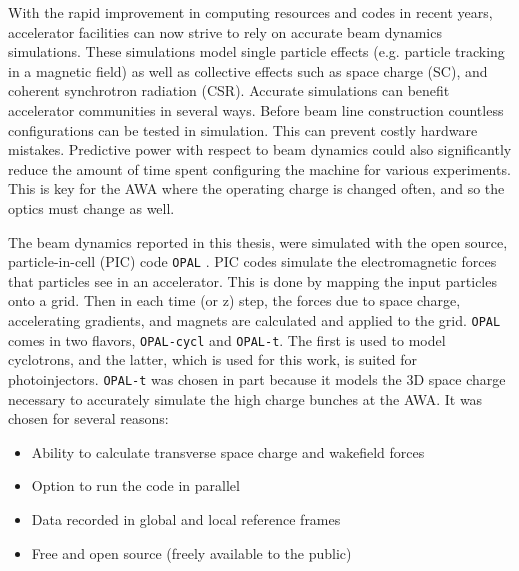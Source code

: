   \label{simulations}
\label{sec:code}

With the rapid improvement in computing resources and codes in recent years,  
accelerator facilities can now strive to rely on accurate beam dynamics simulations. 
These simulations model single particle effects 
(e.g. particle tracking in a magnetic field) as well as collective effects such as space charge (SC),  
and coherent synchrotron radiation (CSR).
Accurate simulations can benefit accelerator communities in several ways.
Before beam line construction countless configurations can be tested in simulation.
This can prevent costly hardware mistakes. 
Predictive power with respect to beam dynamics could also significantly reduce the amount of time 
spent configuring the machine for various experiments. This is key for the AWA
where the operating charge is changed often, and so the optics must change as well.

The beam dynamics reported in this thesis, were simulated with 
the open source, particle-in-cell (PIC) code \verb|OPAL| \cite{opal}. 
PIC codes simulate the electromagnetic forces that particles see in an accelerator. 
This is done by mapping the input particles onto a grid. 
Then in each time (or z) step, the forces due to space charge, accelerating gradients, 
and magnets are calculated and applied to the grid.
\verb|OPAL| comes in two flavors, \verb|OPAL-cycl| and \verb|OPAL-t|. The first is used to model 
cyclotrons, and the latter, which is used for this work, is suited for photoinjectors. 
\verb|OPAL-t| was chosen in part because it models the 3D space charge necessary to accurately simulate the high charge bunches at the AWA. 
It was chosen for several reasons:
\begin{itemize}
	\item Ability to calculate transverse space charge and wakefield forces 
	\item Option to run the code in parallel
	\item Data recorded in global and local reference frames 
	\item Free and open source (freely available to the public)
\end{itemize} 

